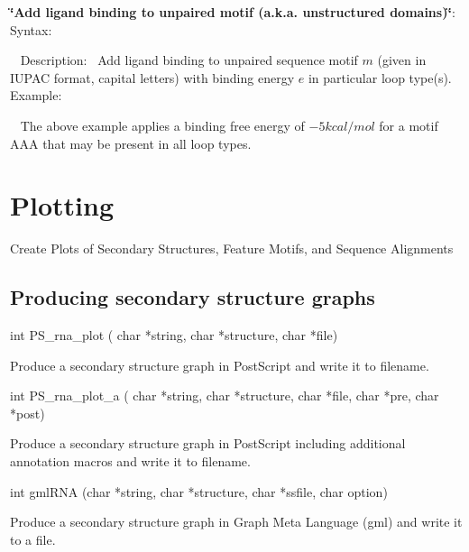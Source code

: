 \begin{DoxyEnumerate}
\item {\bfseries{\char`\"{}\+Add ligand binding to unpaired motif (a.\+k.\+a. unstructured domains)\char`\"{}}}\+:~\newline
 Syntax\+:
\begin{DoxyCode}{0}
\end{DoxyCode}
~\newline
 Description\+:~\newline
 Add ligand binding to unpaired sequence motif $ m $ (given in I\+U\+P\+AC format, capital letters) with binding energy $ e $ in particular loop type(s).~\newline
 Example\+: 
\begin{DoxyCode}{0}
\end{DoxyCode}
~\newline
 The above example applies a binding free energy of $ -5 kcal/mol $ for a motif A\+AA that may be present in all loop types. 
\end{DoxyEnumerate}\hypertarget{plots}{}\section{Plotting}\label{plots}
Create Plots of Secondary Structures, Feature Motifs, and Sequence Alignments\hypertarget{plots_utils_ss}{}\subsection{Producing secondary structure graphs}\label{plots_utils_ss}
\begin{DoxyVerb}int PS_rna_plot ( char *string,
                  char *structure,
                  char *file)
\end{DoxyVerb}
 Produce a secondary structure graph in Post\+Script and write it to \textquotesingle{}filename\textquotesingle{}.

\begin{DoxyVerb}int PS_rna_plot_a (
            char *string,
            char *structure,
            char *file,
            char *pre,
            char *post)
\end{DoxyVerb}
 Produce a secondary structure graph in Post\+Script including additional annotation macros and write it to \textquotesingle{}filename\textquotesingle{}.

\begin{DoxyVerb}int gmlRNA (char *string,
            char *structure,
            char *ssfile,
            char option)
\end{DoxyVerb}
 Produce a secondary structure graph in Graph Meta Language (gml) and write it to a file.

